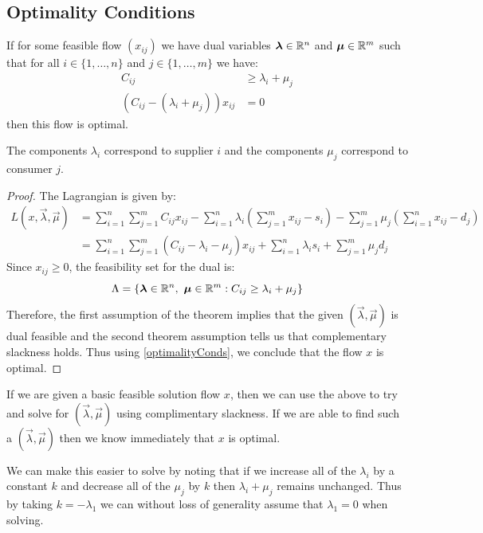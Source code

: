 \documentclass[../main.tex]{subfiles}
\begin{document}
\subsection{Optimality Conditions}
\begin{theorem}
  If for some feasible flow $(x_{i j})$ we have dual variables $\mathbf{\bm{\lambda}} \in \mathbb{R}^{n}$ and $\mathbf{\bm{\mu}} \in \mathbb{R}^{m}$  such that for all $i \in \{1, \ldots, n\}$ and $j \in \{1, \ldots, m\}$ we have: \label{transportOpti}
  \begin{align*}
    C_{i j} &\geq \lambda_i + \mu_j \\
    (C_{i j} - (\lambda_i + \mu_j)) x_{i j} &= 0
  \end{align*}
  then this flow is optimal.
\end{theorem}
\begin{remark}
  The components $\lambda_i$ correspond to supplier $i$ and the components $\mu_j$ correspond to consumer $j$.
\end{remark}
\begin{proof}
  The Lagrangian is given by:
  \begin{align*}
    L(x, \vec{\lambda}, \vec{\mu}) &= \sum_{i = 1}^{n} \sum_{j = 1}^{m} C_{i j}x_{i j} - \sum_{i = 1}^{n} \lambda_i \left(\sum_{j = 1}^{m} x_{i j} - s_i\right) - \sum_{j  =1}^{m} \mu_j \left(\sum_{i = 1}^{n} x_{ij} - d_j\right) \\
                                   &= \sum_{i = 1}^{n} \sum_{j = 1}^{m} (C_{i j} - \lambda_i - \mu_j)x_{i j} + \sum_{i = 1}^{n} \lambda_i s_i + \sum_{j = 1}^{m} \mu_j d_j
  \end{align*}
  Since $x_{i j} \geq 0$, the feasibility set for the dual is:
  \[
    \Lambda = \{\mathbf{\bm{\lambda}} \in \mathbb{R}^{n},\ \mathbf{\bm{\mu}} \in \mathbb{R}^{m}: C_{i j} \geq \lambda_i + \mu_j \}
  \]
  Therefore, the first assumption of the theorem implies that the given $(\vec{\lambda}, \vec{\mu})$ is dual feasible and the second theorem assumption tells us that complementary slackness holds.
  Thus using \cref{optimalityConds}, we conclude that the flow $x$ is optimal.
\end{proof}
\begin{remark} \label{wlogRemark}
  If we are given a basic feasible solution flow $x$, then we can use the above to try and solve for $(\vec{\lambda}, \vec{\mu})$ using complimentary slackness.
  If we are able to find such a $(\vec{\lambda}, \vec{\mu})$ then we know immediately that $x$ is optimal.

  We can make this easier to solve by noting that if we increase all of the $\lambda_i$ by a constant $k$ and decrease all of the $\mu_j$ by $k$ then $\lambda_i + \mu_j$ remains unchanged.
  Thus by taking $k = -\lambda_1$ we can without loss of generality assume that $\lambda_1 = 0$ when solving.
\end{remark}
\end{document}
